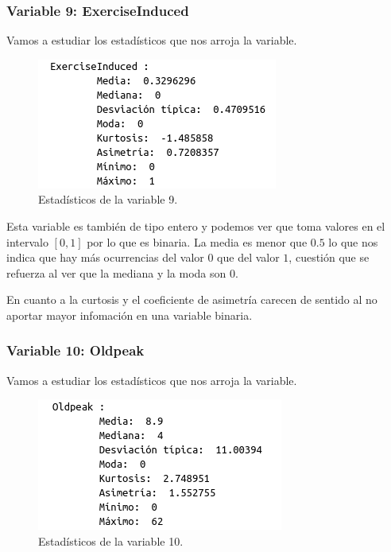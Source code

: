 \documentclass[12pt,a4paper]{article}
\begin{document}
\subsubsection*{Variable 9: ExerciseInduced}

Vamos a estudiar los estadísticos que nos arroja la variable.

\begin{figure}[H]
	\centering
	\includegraphics[scale=0.7]{./Imagenes/EDA/Clasificacion/estadisticos_variable9.png}
	\caption{Estadísticos de la variable 9.}
\end{figure}

Esta variable es también de tipo entero y podemos ver que toma valores en el intervalo $[0,1]$ por lo que es binaria. La media es menor que $0.5$ lo que nos indica que hay más ocurrencias del valor $0$ que del valor $1$, cuestión que se refuerza al ver que la mediana y la moda son $0$.

En cuanto a la curtosis y el coeficiente de asimetría carecen de sentido al no aportar mayor infomación en una variable binaria.

\subsubsection*{Variable 10: Oldpeak}

Vamos a estudiar los estadísticos que nos arroja la variable.

\begin{figure}[H]
	\centering
	\includegraphics[scale=0.7]{./Imagenes/EDA/Clasificacion/estadisticos_variable10.png}
	\caption{Estadísticos de la variable 10.}
\end{figure}
\end{document}
